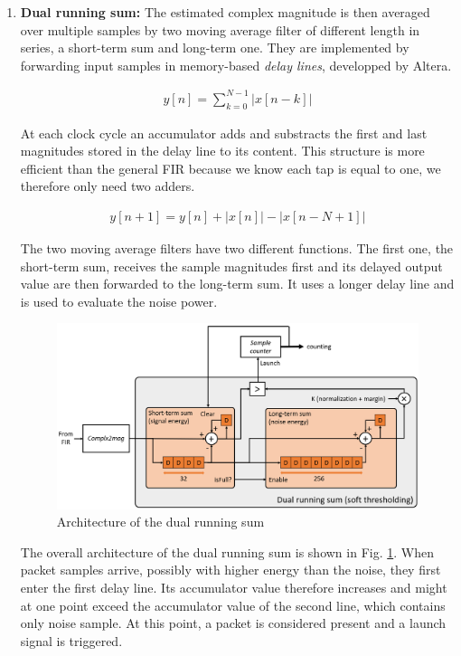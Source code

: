 \begin{enumerate}
    \item \textbf{Dual running sum: } The estimated complex magnitude is then averaged over multiple samples by two moving average filter of different length in series, a short-term sum and long-term one. They are implemented by forwarding input samples in  memory-based \textit{delay lines}, developped by Altera.

    \begin{align}
            y[n] = \sum_{k=0}^{N-1}\left|x[n-k]\right|
    \end{align}

    At each clock cycle an accumulator adds and substracts the first and last magnitudes stored in the delay line to its content. This structure is more efficient than the general FIR because we know each tap is equal to one, we therefore only need two adders.

    \begin{align}
            y[n+1] = y[n] + \left|x[n]\right| - \left|x[n-N+1]\right|
    \end{align}

    The two moving average filters have two different functions. The first one, the short-term sum, receives the sample magnitudes first and its delayed output value are then forwarded to the long-term sum. It uses a longer delay line and is used to evaluate the noise power.

    \begin{figure}[h]
        \centering
        \includegraphics[width=\linewidth]{figures/dual_running_sum_block.png}
        \caption{Architecture of the dual running sum}
        \label{fig:dual_runnign_sum}
    \end{figure}

    The overall architecture of the dual running sum is shown in Fig. \ref{fig:dual_runnign_sum}. When packet samples arrive, possibly with  higher energy than the noise, they first enter the first delay line. Its accumulator value therefore increases and might at one point exceed the accumulator value of the second line, which contains only noise sample. At this point, a packet is considered present and a launch signal is triggered.


\end{enumerate}
